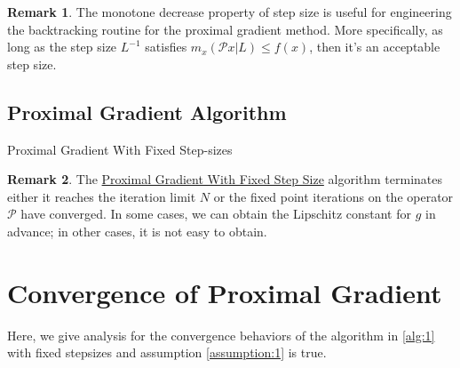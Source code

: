 \documentclass[]{article}
\theoremstyle{definition}
\newtheorem{remark}{Remark}[subsection]
{
    \newtheorem{assumption}{Assumption}
}
\begin{document}
        \begin{remark}
            The monotone decrease property of step size is useful for engineering the backtracking routine for the proximal gradient method. More specifically, as long as the step size $L^{-1}$ satisfies $m_x(\mathcal Px | L)\le f(x)$, then it's an acceptable step size. 
        \end{remark}
    \subsection{Proximal Gradient Algorithm}
        \begin{algorithm}[H]
            \begin{algorithmic}[1]
                \ENDIF
            \ENDFOR
            \end{algorithmic}
            \caption{Proximal Gradient With Fixed Step-sizes}
            \label{alg:1}
        \end{algorithm}
        \begin{remark}
            The \hyperref[alg:1]{Proximal Gradient With Fixed Step Size} algorithm terminates either it reaches the iteration limit $N$ or the fixed point iterations on the operator $\mathcal P$ have converged. In some cases, we can obtain the Lipschitz constant for $g$ in advance; in other cases, it is not easy to obtain. 
        \end{remark}

\section{Convergence of Proximal Gradient}\label{sec:pg_convergence}
    Here, we give analysis for the convergence behaviors of the algorithm in \hyperref[alg:1]{\ref*{alg:1}} with fixed stepsizes and assumption \hyperref[assumption:1]{\ref*{assumption:1}} is true. 
\end{document}
